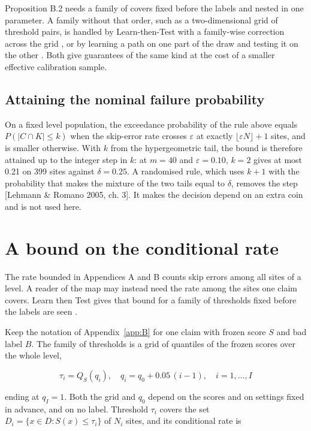 \documentclass{iopjournal}
\begin{document}
Proposition B.2 needs a family of covers fixed before the labels and nested in one parameter. A family without that order, such as a two-dimensional grid of threshold pairs, is handled by Learn-then-Test with a family-wise correction across the grid \cite{Angelopoulos2025}, or by learning a path on one part of the draw and testing it on the other \cite{LauferGoldshtein2023}. Both give guarantees of the same kind at the cost of a smaller effective calibration sample.

\hypertarget{attaining-the-nominal-failure-probability}{%
\subsection{Attaining the nominal failure probability}\label{attaining-the-nominal-failure-probability}}

On a fixed level population, the exceedance probability of the rule above equals \(P(|C \cap K| \le k)\) when the skip-error rate crosses \(\varepsilon\) at exactly \(\lfloor \varepsilon N \rfloor + 1\) sites, and is smaller otherwise. With \(k\) from the hypergeometric tail, the bound is therefore attained up to the integer step in \(k\): at \(m = 40\) and \(\varepsilon = 0.10\), \(k = 2\) gives at most 0.21 on 399 sites against \(\delta = 0.25\). A randomised rule, which uses \(k + 1\) with the probability that makes the mixture of the two tails equal to \(\delta\), removes the step {[}Lehmann \& Romano 2005, ch. 3{]}. It makes the decision depend on an extra coin and is not used here.

\hypertarget{app:C}{%
\section{A bound on the conditional rate}\label{app:C}}

The rate bounded in Appendices A and B counts skip errors among all sites of a level. A reader of the map may instead need the rate among the sites one claim covers. Learn then Test gives that bound for a family of thresholds fixed before the labels are seen \cite{Angelopoulos2025}.

Keep the notation of Appendix~\ref{app:B} for one claim with frozen score \(S\) and bad label \(B\). The family of thresholds is a grid of quantiles of the frozen scores over the whole level,

\[
\tau_i = Q_S(q_i), \quad q_i = q_0 + 0.05\,(i - 1), \quad i = 1, \dots, I
\]

ending at \(q_I = 1\). Both the grid and \(q_0\) depend on the scores and on settings fixed in advance, and on no label. Threshold \(\tau_i\) covers the set \(D_i = \{x \in D : S(x) \le \tau_i\}\) of \(N_i\) sites, and its conditional rate is
\end{document}
